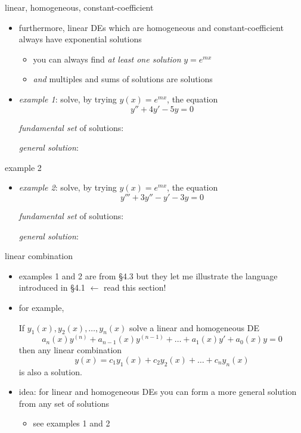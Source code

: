 \documentclass{beamer}
\begin{document}
\begin{frame}{linear, homogeneous, constant-coefficient}

\begin{itemize}
\item furthermore, linear DEs which are \alert{homogeneous and constant-coefficient always have exponential solutions}
    \begin{itemize}
    \item you can always find \emph{at least one solution} $y=e^{mx}$
    \item \emph{and} multiples and sums of solutions are solutions
    \end{itemize}
\item \emph{example 1}: solve, by trying $y(x)=e^{mx}$, the equation
    $$y'' + 4 y' - 5 y = 0$$

\vspace{30mm}
\small
\noindent \emph{fundamental set} of solutions:

\medskip
\noindent \emph{general solution}:
\end{itemize}
\end{frame}


\begin{frame}{example 2}

\begin{itemize}
\item \emph{example 2}: solve, by trying $y(x)=e^{mx}$, the equation
    $$y''' + 3 y'' - y' - 3 y = 0$$

\vspace{40mm}
\small
\noindent \emph{fundamental set} of solutions:

\medskip
\noindent \emph{general solution}:
\end{itemize}
\end{frame}


\begin{frame}{linear combination}

\begin{itemize}
\item examples 1 and 2 are from \S 4.3 but they let me illustrate the language introduced in \S 4.1 \alert{$\longleftarrow$ read this section!}
\item for example,
\begin{theorem}
If $y_1(x), y_2(x), \dots, y_n(x)$ solve a linear and homogeneous DE
\begin{equation*}
    a_n(x) y^{(n)} + a_{n-1}(x) y^{(n-1)} + \dots + a_1(x) y' + a_0(x) y = 0
\end{equation*}
then any linear combination
    $$y(x) = c_1 y_1(x) + c_2 y_2(x) + \dots + c_n y_n(x)$$
is also a solution.
\end{theorem}

\item idea: for linear and homogeneous DEs you can form a more general solution from any set of solutions
    \begin{itemize}
    \item see examples 1 and 2
    \end{itemize}        
\end{itemize}
\end{frame}
\end{document}
